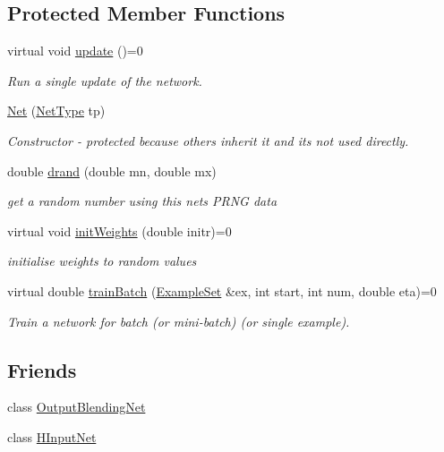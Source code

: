 \subsection*{Protected Member Functions}
\begin{DoxyCompactItemize}
\item 
virtual void \hyperlink{classNet_ad02198e219d3ba060c88d764ce54b905}{update} ()=0
\begin{DoxyCompactList}\small\item\em Run a single update of the network. \end{DoxyCompactList}\item 
\hyperlink{classNet_a4bb31bf5599d954de2062747166b7dff}{Net} (\hyperlink{netType_8hpp_a1526df0fc932ccf720aa26267f923213}{Net\+Type} tp)
\begin{DoxyCompactList}\small\item\em Constructor -\/ protected because others inherit it and it\textquotesingle{}s not used directly. \end{DoxyCompactList}\item 
double \hyperlink{classNet_aede931306b87045c0e6f14ee947a8ef7}{drand} (double mn, double mx)
\begin{DoxyCompactList}\small\item\em get a random number using this net\textquotesingle{}s P\+R\+NG data \end{DoxyCompactList}\item 
virtual void \hyperlink{classNet_a5bbf19d2255b0c8418c9bd54930290cf}{init\+Weights} (double initr)=0
\begin{DoxyCompactList}\small\item\em initialise weights to random values \end{DoxyCompactList}\item 
virtual double \hyperlink{classNet_a6ac1fa9f916aa77906581af9140b8175}{train\+Batch} (\hyperlink{classExampleSet}{Example\+Set} \&ex, int start, int num, double eta)=0
\begin{DoxyCompactList}\small\item\em Train a network for batch (or mini-\/batch) (or single example). \end{DoxyCompactList}\end{DoxyCompactItemize}
\subsection*{Friends}
\begin{DoxyCompactItemize}
\item 
class \hyperlink{classNet_a9ffff8d20e4d424b4358f43e204c7d1b}{Output\+Blending\+Net}
\item 
class \hyperlink{classNet_a8e75331604ab50e15c580aeb31b3804f}{H\+Input\+Net}
\end{DoxyCompactItemize}



